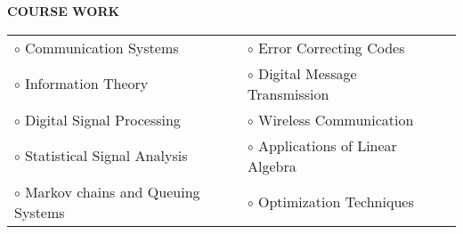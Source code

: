 \documentclass[a4paper,10pt]{article}
\begin{document}
 \colorbox{titleColor}{\parbox{6.5in}{\textbf{COURSE WORK}}}

 \begin{tabular}{p{3.5in}p{5in}p{3.5in}}
     $\circ$ Communication Systems		&$\circ$ Error Correcting Codes \\
    $\circ$ Information Theory			&$\circ$ Digital Message Transmission \\
    $\circ$ Digital Signal Processing		&$\circ$ Wireless Communication \\
    $\circ$ Statistical Signal Analysis	&$\circ$ Applications of Linear Algebra \\
    $\circ$ Markov chains and Queuing Systems	&$\circ$ Optimization Techniques \\
    
    \end{tabular}
    
\end{document}

